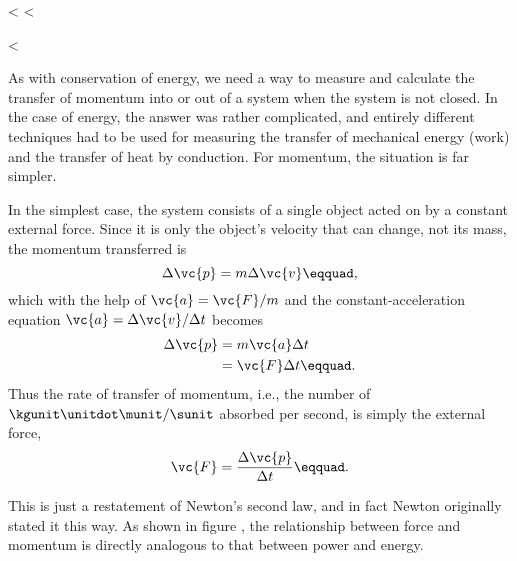 <%
<%

  <%

As with conservation of energy, we need a way to measure and
calculate the transfer of momentum into or out of a system
when the system is not closed. In the case of energy, the
answer was rather complicated, and entirely different
techniques had to be used for measuring the transfer of
mechanical energy (work) and the transfer of heat by
conduction. For momentum, the situation is far simpler.

In the simplest case, the system consists of a single object
acted on by a constant external force. Since it is only the
object's velocity that can change, not its mass, the
momentum transferred is
\begin{equation*}
                \Delta\vc{p}         =    m\Delta\vc{v}\eqquad,
\end{equation*}
which with the help of $\vc{a}=\vc{F}/m$ and the constant-acceleration
equation $\vc{a}=\Delta\vc{v}/\Delta t$ becomes
\begin{align*}
 \Delta\vc{p} &= m\vc{a}\Delta t \\
 &= \vc{F}\Delta t\eqquad.
\end{align*}
Thus the rate of transfer of momentum, i.e., the number of
$\kgunit\unitdot\munit/\sunit$ absorbed per second, is simply the external force,
\begin{equation*}
        \vc{F}         =    \frac{\Delta\vc{p}}{\Delta t}\eqquad.
\end{equation*}
\begin{longnoteafterequation}
\end{longnoteafterequation}
\noindent This is just a restatement of Newton's
second law, and in fact Newton originally stated it this
way. As shown in figure , the relationship between force
and momentum is directly analogous to that between power and energy.

